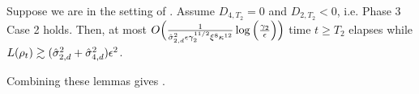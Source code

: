 \begin{lemma}  \label{lemma:phase3_case2_overall_time}
Suppose we are in the setting of . Assume $D_{4, T_2} = 0$ and $D_{2, T_2} < 0$, i.e. Phase 3 Case 2 holds. Then, at most $O\Big(\frac{1}{\hat{\sigma}_{2, d}^2 \epsilon \gamma_2^{11/2}\xi^8 \kappa^{12}} \log\Big(\frac{\gamma_2}{\epsilon}\Big)\Big)$ time $t \geq T_2$ elapses while $L(\rho_t) \gtrsim (\hat{\sigma}_{2, d}^2 + \hat{\sigma}_{4, d}^2) \epsilon^2$.
\end{lemma}

Combining these lemmas gives .